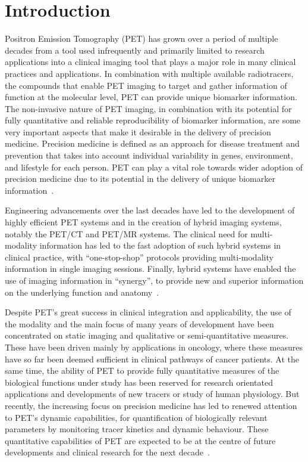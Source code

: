 \chapter{Introduction}
Positron Emission Tomography (PET) has grown over a period of multiple decades from a tool used infrequently and primarily limited to research applications into a clinical imaging tool that plays a major role in many clinical practices and applications. 
In combination with multiple available radiotracers, the compounds that enable PET imaging to target and gather information of function at the molecular level, PET can provide unique biomarker information. The non-invasive nature of PET imaging, in combination with its potential for fully quantitative and reliable reproducibility of biomarker information, are some very important aspects that make it desirable in the delivery of precision medicine. Precision medicine is defined as an approach for disease treatment and prevention that takes into account individual variability in genes, environment, and lifestyle for each person. PET can play a vital role towards wider adoption of precision medicine due to its potential in the delivery of unique biomarker information~\cite{Subramaniam2017}.

Engineering advancements over the last decades have led to the development of highly efficient PET systems and in the creation of hybrid imaging systems, notably the PET/CT and PET/MR systems. The clinical need for multi-modality information has led to the fast adoption of such hybrid systems in clinical practice, with “one-stop-shop” protocols providing multi-modality information in single imaging sessions. Finally, hybrid systems have enabled the use of imaging information in “synergy”, to provide new and superior information on the underlying function and anatomy~\cite{Besson2020}.

Despite PET’s great success in clinical integration and applicability, the use of the modality and the main focus of many years of development have been concentrated on static imaging and qualitative or semi-quantitative measures. These have been driven mainly by applications in oncology, where these measures have so far been deemed sufficient in clinical pathways of cancer patients. At the same time, the ability of PET to provide fully quantitative measures of the biological functions under study has been reserved for research orientated applications and developments of new tracers or study of human physiology. 
But recently, the increasing focus on precision medicine has led to renewed attention to PET’s dynamic capabilities, for quantification of biologically relevant parameters by monitoring tracer kinetics and dynamic behaviour. These quantitative capabilities of PET are expected to be at the centre of future developments and clinical research for the next decade~\cite{Lammertsma2017,Meikle2021}.

